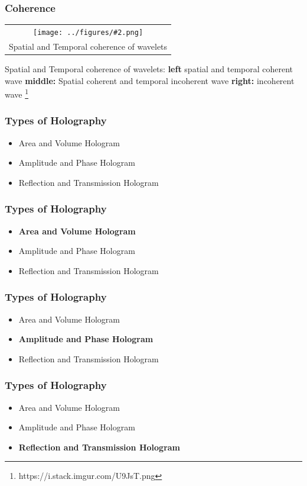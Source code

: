 \documentclass{beamer}
\newcommand{\gra}[3][]{
	\begin{table}
	\centering
	\begin{tabular}[width=\textwidth]{c}
		\texttt{[image: ../figures/\#2.png]}\\
		\small #3
	\end{tabular}
	\end{table}
}
\begin{document}
\begin{frame}
	\frametitle{Coherence}
	\gra[0.8]{Coherence}{Spatial and Temporal coherence of wavelets}{Spatial and Temporal coherence of wavelets: \textbf{left} spatial and temporal coherent wave \textbf{middle:} Spatial coherent and temporal incoherent wave \textbf{right:} incoherent wave \footnote{https://i.stack.imgur.com/U9JsT.png}}
\end{frame}
\begin{frame}
	\frametitle{Types of Holography}
	\begin{itemize}
			\item Area and Volume Hologram
			\item Amplitude and Phase Hologram
			\item Reflection and Transmission Hologram
	\end{itemize}
\end{frame}

\begin{frame}
	\frametitle{Types of Holography}
	\begin{itemize}
		\item \textbf{{Area and Volume Hologram}}
		\item Amplitude and Phase Hologram
		\item Reflection and Transmission Hologram
	\end{itemize}
\end{frame}
\begin{frame}
	\frametitle{Types of Holography}
	\begin{itemize}
		\item Area and Volume Hologram
		\item \textbf{Amplitude and Phase Hologram}
		\item Reflection and Transmission Hologram
	\end{itemize}
\end{frame}

\begin{frame}
	\frametitle{Types of Holography}
	\begin{itemize}
		\item Area and Volume Hologram
		\item Amplitude and Phase Hologram
		\item \textbf{Reflection and Transmission Hologram}
	\end{itemize}
\end{frame}
\end{document}
